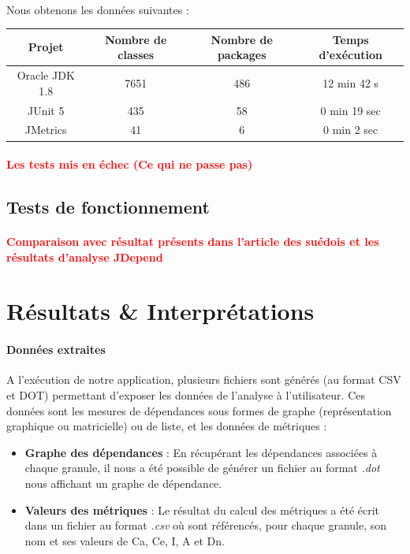 \documentclass{scrartcl}
\newcommand{\TODO}[1] {
    \noindent \paragraph{\textcolor{red}{#1}}
}
\begin{document}
    \paragraph{}Nous obtenons les données suivantes : 
    \begin{center}
        \begin{tabular}{|c|c|c|c|}\hline
            Projet & Nombre de classes & Nombre de packages & Temps d'exécution \\ \hline
            Oracle JDK 1.8 & 7651 & 486 & 12 min 42 s \\ \hline
            JUnit 5 & 435 & 58 & 0 min 19 sec \\ \hline
            JMetrics & 41 & 6 & 0 min 2 sec \\ \hline
        \end{tabular}
    \end{center}

    \TODO{Les tests mis en échec (Ce qui ne passe pas)}


\subsection{Tests de fonctionnement}
    \TODO{Comparaison avec résultat présents dans l'article des suédois et les résultats d'analyse JDepend}

\newpage
\section{Résultats \& Interprétations}

    \paragraph{Données extraites}A l'exécution de notre application, plusieurs fichiers sont générés (au format CSV et DOT) permettant d'exposer les données de l'analyse à l'utilisateur. Ces données sont les mesures de dépendances sous formes de graphe (représentation graphique ou matricielle) ou de liste, et les données de métriques :
    \begin{itemize}
        \item \textbf{Graphe des dépendances} : En récupérant les dépendances associées à chaque granule, il nous a été possible de générer un fichier au format \emph{.dot} nous affichant un graphe de dépendance. 
        \item \textbf{Valeurs des métriques} : Le résultat du calcul des métriques a été écrit dans un fichier au format \emph{.csv} où sont référencés, pour chaque granule, son nom et ses valeurs de Ca, Ce, I, A et Dn.
    \end{itemize}
\end{document}
